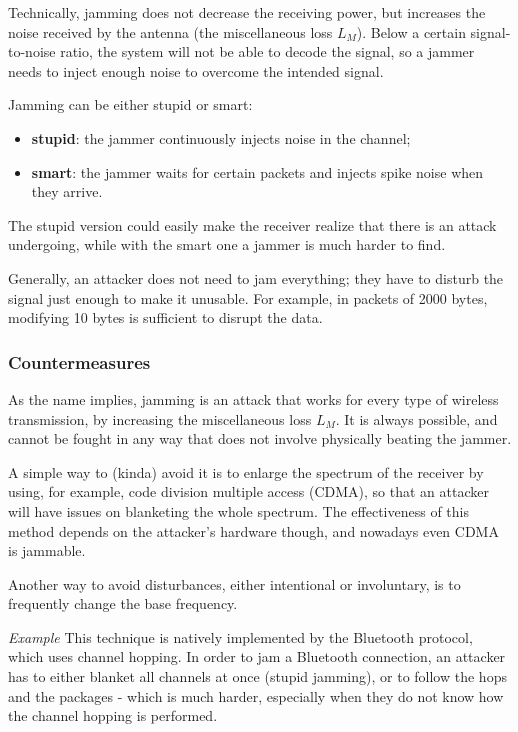 Technically, jamming does not decrease the receiving power, but increases the noise received by the antenna (the miscellaneous loss $L_M$). Below a certain signal-to-noise ratio, the system will not be able to decode the signal, so a jammer needs to inject enough noise to overcome the intended signal.

Jamming can be either stupid or smart:

\begin{itemize}
    \item \textbf{stupid}: the jammer continuously injects noise in the channel;
    \item \textbf{smart}: the jammer waits for certain packets and injects spike noise when they arrive.
\end{itemize}

The stupid version could easily make the receiver realize that there is an attack undergoing, while with the smart one a jammer is much harder to find.

Generally, an attacker does not need to jam everything; they have to disturb the signal just enough to make it unusable. For example, in packets of 2000 bytes, modifying 10 bytes is sufficient to disrupt the data.


\subsubsection*{Countermeasures}
As the name implies, jamming is an attack that works for every type of wireless transmission, by increasing the miscellaneous loss $L_M$. It is always possible, and cannot be fought in any way that does not involve physically beating the jammer.

A simple way to (kinda) avoid it is to enlarge the spectrum of the receiver by using, for example, code division multiple access (CDMA), so that an attacker will have issues on blanketing the whole spectrum. The effectiveness of this method depends on the attacker's hardware though, and nowadays even CDMA is jammable.

Another way to avoid disturbances, either intentional or involuntary, is to frequently change the base frequency.

\vspace{0.5em}

\emph{Example} This technique is natively implemented by the Bluetooth protocol, which uses channel hopping. In order to jam a Bluetooth connection, an attacker has to either blanket all channels at once (stupid jamming), or to follow the hops and the packages - which is much harder, especially when they do not know how the channel hopping is performed.

